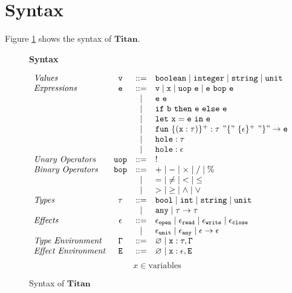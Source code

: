 \documentclass[12pt, a4paper, titlepage]{report}
\begin{document}
  \section{Syntax}
    Figure \ref{fig:syntax} shows the syntax of $\mathbf{Titan}$.
    \begin{figure}[htbp]
      \centering
      \begin{flushleft}
        \textbf{Syntax}
      \end{flushleft}
      \[
      \begin{array}{lccl}
        \emph{Values} &
          \mathtt{v} & ::= & \mathtt{boolean \mid integer \mid string \mid unit}\\
        \emph{Expressions} &
          \mathtt{e} & ::= & \mathtt{v} \mid \mathtt{x} \mid \mathtt{uop\ e \mid e\ bop\ e} \\
          & & \mid & \mathtt{e\ e} \\
          & & \mid & \mathtt{if}\ \mathtt{b}\ \mathtt{then}\ \mathtt{e}\ \mathtt{else}\ \mathtt{e} \\
          & & \mid & \mathtt{let}\ \mathtt{x = e}\ \mathtt{in}\ \mathtt{e} \\
          & & \mid & \mathtt{fun}\ \mathtt{\{(x : \tau)\}^{+} : \tau\ "\{"\ \{\epsilon\}^{+}\ "\}" \to e} \\
          & & \mid & \mathtt{hole : \tau} \\
          & & \mid & \mathtt{hole : \epsilon} \\
        \emph{Unary Operators} &
          \mathtt{uop} & ::= & ! \\
        \emph{Binary Operators} &
          \mathtt{bop} & ::= & \mathtt{+} \mid \mathtt{-} \mid \mathtt{\times} \mid \mathtt{/} \mid \mathtt{\%} \\
          & & \mid & \mathtt{=} \mid \mathtt{\neq} \mid \mathtt{<} \mid \mathtt{\leq} \\
          & & \mid & \mathtt{>} \mid \mathtt{\geq} \mid \mathtt{\land} \mid \mathtt{\lor} \\
        \emph{Types} &
          \mathtt{\tau} & ::= & \mathtt{bool \mid int \mid string \mid unit} \\
          & & \mid & \mathtt{any \mid \tau \to \tau} \\
        \emph{Effects} &
          \mathtt{\epsilon} & ::= & \mathtt{\epsilon_{open} \mid \epsilon_{read} \mid \epsilon_{write} \mid \epsilon_{close}} \\
          & & \mid & \mathtt{\epsilon_{unit} \mid \epsilon_{any} \mid \epsilon \to \epsilon} \\
        \emph{Type Environment} &
          \mathtt{\Gamma} & ::= & \mathtt{\varnothing \mid x : \tau, \Gamma} \\
        \emph{Effect Environment} &
          \mathtt{E} & ::= & \mathtt{\varnothing \mid x : \epsilon, E} \\
      \end{array}
      \]
      \[
        x \in \textrm{variables}
      \]
      \caption{Syntax of $\mathbf{Titan}$}
      \label{fig:syntax}
    \end{figure}
\end{document}
